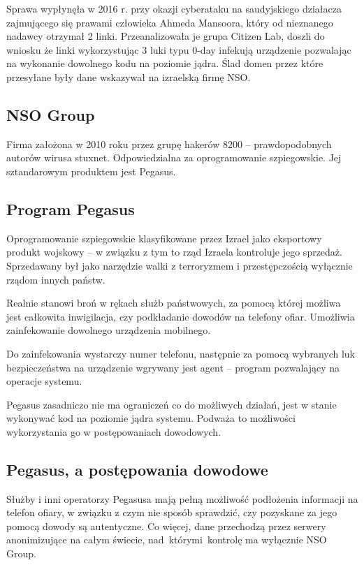 \documentclass{article}
\begin{document}
Sprawa wypłynęła w 2016 r. przy okazji cyberataku na saudyjskiego działacza zajmującego się prawami człowieka Ahmeda Mansoora, który od nieznanego nadawcy otrzymał 2 linki. Przeanalizowała je grupa Citizen Lab, doszli do wniosku że linki wykorzystując 3 luki typu 0-day infekują urządzenie pozwalając na wykonanie dowolnego kodu na poziomie jądra. Ślad domen przez które przesyłane były dane wskazywał na izraelską firmę NSO.

\subsection{NSO Group}

Firma założona w 2010 roku przez grupę hakerów 8200 -- prawdopodobnych autorów wirusa stuxnet. Odpowiedzialna za oprogramowanie szpiegowskie. Jej sztandarowym produktem jest Pegasus.

\subsection{Program Pegasus}

Oprogramowanie szpiegowskie klasyfikowane przez Izrael jako eksportowy produkt wojskowy -- w związku z tym to rząd Izraela kontroluje jego sprzedaż. Sprzedawany był jako narzędzie walki z terroryzmem i przestępczością wyłącznie rządom innych państw.

Realnie stanowi broń w rękach służb państwowych, za pomocą której możliwa jest całkowita inwigilacja, czy podkładanie dowodów na telefony ofiar.
Umożliwia zainfekowanie dowolnego urządzenia mobilnego.

Do zainfekowania wystarczy numer telefonu, następnie za pomocą wybranych luk bezpieczeństwa na urządzenie wgrywany jest agent -- program pozwalający na operacje systemu.

Pegasus zasadniczo nie ma ograniczeń co do możliwych działań, jest w stanie wykonywać kod na poziomie jądra systemu. Podważa to możliwości wykorzystania go w postępowaniach dowodowych.

\subsection{Pegasus, a postępowania dowodowe}

Służby i inni operatorzy Pegasusa mają pełną możliwość podłożenia informacji na telefon ofiary, w związku z czym nie sposób sprawdzić, czy pozyskane za jego pomocą dowody są autentyczne. Co więcej, dane przechodzą przez serwery anonimizujące na całym świecie, nad~którymi~kontrolę ma wyłącznie NSO Group.
\end{document}
